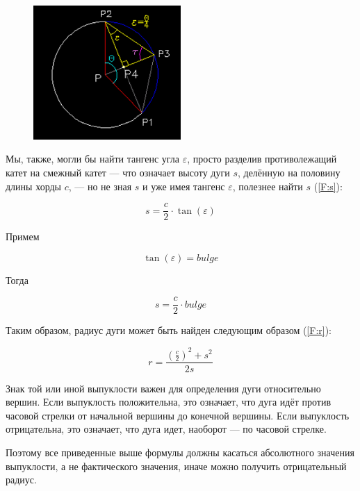 \begin{figure}[H]
	\centering
	\includegraphics[width=0.5\textwidth]{figures/epsilon.png}
	\label{fig:epsilon}
\end{figure}

Мы, также, могли бы найти тангенс угла $\varepsilon$, просто разделив противолежащий катет на смежный катет --- что означает высоту дуги $s$, делённую на половину длины хорды $c$, --- но не зная $s$ и уже имея тангенс $\varepsilon$, полезнее найти $s$ (\ref{F:s}):

\begin{equation}
	s=\frac{c}{2}\cdot\tan(\varepsilon)
	\label{F:s}
\end{equation}

Примем

\begin{equation}
	\tan(\varepsilon)=bulge
	\label{F:tanepsilon}
\end{equation}

Тогда

\begin{equation}
	s=\frac{c}{2}\cdot bulge
	\label{F:sfinal}
\end{equation}

Таким образом, радиус дуги может быть найден следующим образом (\ref{F:r}):

\begin{equation}
	r=\frac{(\frac{c}{2})^2+s^2}{2s}
	\label{F:r}
\end{equation}

Знак той или иной выпуклости важен для определения дуги относительно вершин. Если выпуклость положительна, это означает, что дуга идёт против часовой стрелки от начальной вершины до конечной вершины. Если выпуклость отрицательна, это означает, что дуга идет, наоборот --- по часовой стрелке.

Поэтому все приведенные выше формулы должны касаться абсолютного значения выпуклости, а не фактического значения, иначе можно получить отрицательный радиус.

